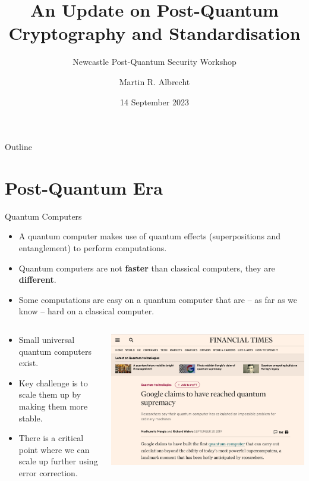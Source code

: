 \documentclass[xcolor=table,10pt,aspectratio=169]{beamer}
\author{Martin R. Albrecht}
\date{14 September 2023}
\title{An Update on Post-Quantum Cryptography and Standardisation}
\subtitle{Newcastle Post-Quantum Security Workshop}
\begin{document}
\maketitle
\begin{frame}{Outline}
\tableofcontents
\end{frame}



\section{Post-Quantum Era}
\label{sec:orgebffcab}
\begin{frame}[label={sec:orgdf292c9}]{Quantum Computers}
\begin{itemize}
\item A quantum computer makes use of quantum effects (superpositions and entanglement) to perform computations.
\item Quantum computers are not \textbf{faster} than classical computers, they are \textbf{different}.
\item Some computations are easy on a quantum computer that are – as far as we know – hard on a classical computer.
\end{itemize}

\begin{columns}[t]
\begin{column}{0.5\columnwidth}
\begin{itemize}
\item Small universal quantum computers exist.
\item Key challenge is to scale them up by making them more stable.
\item There is a critical point where we can scale up further using error correction.
\end{itemize}
\end{column}

\begin{column}{0.4\columnwidth}
\begin{center}
\includegraphics[width=.9\linewidth]{./google-72-qubit.png}
\end{center}
\end{column}
\end{columns}
\end{frame}
\end{document}
